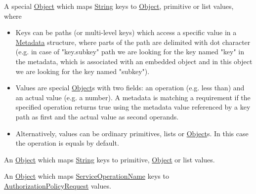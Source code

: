 \documentclass[a4paper]{arrowhead}
\newcommand{\pref}[1]{{\textcolor{ArrowheadGrey}{\hyperref[sec:model:primitives:#1]{#1}}}}
\begin{document}

A special \pref{Object} which maps \pref{String} keys to \pref{Object}, primitive or list values, where 

\begin{itemize}
    \item Keys can be paths (or multi-level keys) which access a specific value in a \hyperref[sec:model:Metadata]{Metadata} structure, where parts of the path are delimited with dot character (e.g. in case of "key.subkey" path we are looking for the key named "key" in the metadata, which is associated with an embedded object and in this object we are looking for the key named "subkey").
    \item Values are special \pref{Object}s with two fields: an operation (e.g. less than) and an actual value (e.g. a number). A metadata is matching a requirement if the specified operation returns true using the metadata value referenced by a key path as first and the actual value as second operands. 
    \item Alternatively, values can be ordinary primitives, lists or \pref{Object}s. In this case the operation is equals by default.
\end{itemize}


An \pref{Object} which maps \pref{String} keys to primitive, \pref{Object} or list values.


An \pref{Object} which maps \pref{ServiceOperationName} keys to \hyperref[sec:model:AuthorizationPolicyRequest]{AuthorizationPolicyRequest} values.

 
\end{document}
